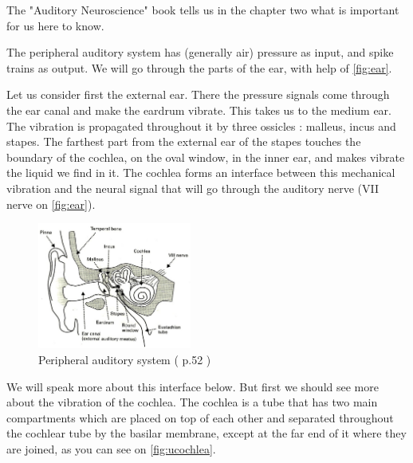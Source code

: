 The "Auditory Neuroscience" book \cite{AuditoryNeuroscience} tells us in the 
chapter two what is important for us here to know. 

The peripheral auditory system has (generally air) pressure as input, 
and spike trains as output. We will go through the parts of the ear, with help 
of \autoref{fig:ear}. 

Let us consider first the external ear. There the pressure signals come through
 the ear canal and make the eardrum vibrate. 
This takes us to the medium ear. 
The vibration is propagated throughout it by three ossicles : malleus, incus 
and stapes. The farthest part from the external ear of the stapes touches the 
boundary of the cochlea, on the oval window, in the inner ear, 
and makes vibrate the liquid we find in it. 
The cochlea forms an interface between this mechanical vibration 
and the neural signal that will go through the auditory nerve 
(VII nerve on \autoref{fig:ear}).
%


\begin{figure}[h]
	\centering
	\includegraphics[width=0.45\textwidth]{images/ear2-aud52-level.jpg}
	\caption{Peripheral auditory system (\cite{AuditoryNeuroscience} p.52 )}
	\label{fig:ear}
\end{figure}

We will speak more about this interface below. But first we should see 
more about the vibration of the cochlea. 
The cochlea is a tube that has two main compartments which are placed on top of 
each other and separated throughout the cochlear tube by  
the basilar membrane,  except at the far end of it where they are joined, 
as you can see on \autoref{fig:ucochlea}.

